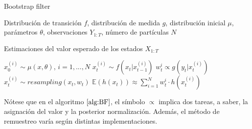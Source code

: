 \begin{algorithm}
\caption{Bootstrap filter}
\label{alg:BF}
\begin{algorithmic}[1]
\vspace{0.2cm}
\Require \parbox[t]{13cm}{
    Distribución de transición $f$, distribución de medida $g$, distribución 
    inicial $\mu$, parámetros $\theta$, observaciones $Y_{1:T}$, número 
    de partículas $N$
}
\vspace{0.2cm}
\Ensure 
\parbox[t]{13cm}{
    Estimaciones del valor esperado de los estados $X_{1:T}$
}
\vspace{0.2cm}
\State $x_0^{(i)} \sim \mu(x,\theta)$, $i=1,...,N$
    \State $x_t^{(i)}\sim f(x_t|x_{t-1}^{(i)})$
    \State $w_{t}^{i} \propto g(y_t|x_t^{(i)})$ 
    \State $x_t^{(i)} \sim resampling(x_t,w_t)$
    \State $\mathbb E\left(h(x_t)\right) \approx \sum_{i=1}^N w_t^{i}\cdot h(x_t^{(i)})$
\EndFor
\end{algorithmic}
\end{algorithm}

Nótese que en el algoritmo $\ref{alg:BF}$, el símbolo $\propto$ implica dos tareas, a saber,
la asignación del valor y la posterior normalización. Además, el método de remuestreo varía
según distintas implementaciones. 
